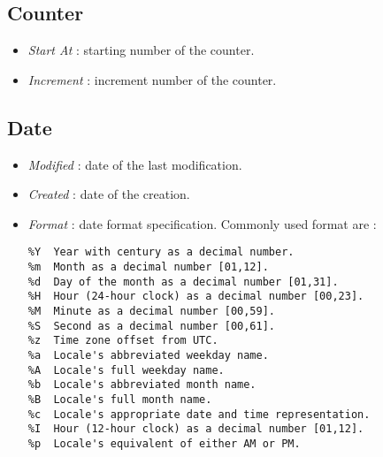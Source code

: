 \documentclass[12pt, a4paper]{scrartcl}
\begin{document}
\subsection{Counter}
\begin{itemize}
    \item \emph{Start At} : starting number of the counter. 
    \item \emph{Increment} : increment number of the counter.
\end{itemize}
\subsection{Date}
\begin{itemize}
    \item \emph{Modified} : date of the last modification.
    \item \emph{Created} : date of the creation.
    \item \emph{Format} : date format specification. Commonly used format are :
\begingroup
    \fontsize{10pt}{12pt}\selectfont
        \begin{verbatim} 
%Y  Year with century as a decimal number.
%m  Month as a decimal number [01,12].
%d  Day of the month as a decimal number [01,31].
%H  Hour (24-hour clock) as a decimal number [00,23].
%M  Minute as a decimal number [00,59].
%S  Second as a decimal number [00,61].
%z  Time zone offset from UTC.
%a  Locale's abbreviated weekday name.
%A  Locale's full weekday name.
%b  Locale's abbreviated month name.
%B  Locale's full month name.
%c  Locale's appropriate date and time representation.
%I  Hour (12-hour clock) as a decimal number [01,12].
%p  Locale's equivalent of either AM or PM.
        \end{verbatim}
\endgroup
\end{itemize}
\end{document}
